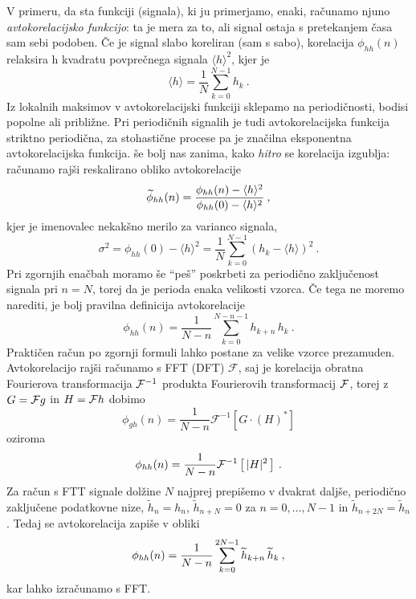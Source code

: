 \documentclass{article}
\begin{document}
V primeru, da sta funkciji (signala), ki ju primerjamo, enaki,
računamo njuno {\sl avtokorelacijsko funkcijo\/}: ta je mera
za to, ali signal ostaja s pretekanjem časa sam sebi podoben.
Če je signal slabo koreliran (sam s sabo), korelacija $\phi_{hh}(n)$
relaksira h kvadratu povprečnega signala $\langle h\rangle^2$, kjer je
\begin{equation*}
\langle h\rangle = \frac{1}{N} \sum_{k=0}^{N-1} h_k \>.  
\end{equation*}
Iz lokalnih maksimov v avtokorelacijski funkciji sklepamo
na periodičnosti, bodisi popolne ali približne.
Pri periodičnih signalih je tudi avtokorelacijska funkcija
striktno periodična, za stohastične procese pa je značilna
eksponentna avtokorelacijska funkcija.
še bolj nas zanima, kako {\sl hitro\/} se korelacija izgublja:
računamo rajši reskalirano obliko avtokorelacije
\begin{equation*}
\widetilde{\phi}_{hh}(n) = 
{ \phi_{hh}(n) - \langle h\rangle^2 \over \phi_{hh}(0) - \langle h\rangle^2 } \>,  
\end{equation*}
kjer je imenovalec nekakšno merilo za  varianco signala,
\begin{equation*}
\sigma^2 = \phi_{hh}(0) - \langle h\rangle^2 
= \frac{1}{N} \sum_{k=0}^{N-1} \left( h_k - \langle h\rangle \right)^2 \>.  
\end{equation*}
Pri zgornjih enačbah moramo še ``peš'' poskrbeti za periodično
zaključenost signala pri $n=N$, torej da je perioda enaka velikosti
vzorca.  Če tega ne moremo narediti, je bolj pravilna definicija
avtokorelacije
\begin{equation*}
\phi_{hh}(n)= \frac{1}{N-n}\sum_{k=0}^{N-n-1} h_{k+n}\, h_k \>.  
\end{equation*}
Praktičen račun po zgornji formuli lahko postane za velike
vzorce prezamuden.  Avtokorelacijo rajši računamo s FFT (DFT) $\mathcal{F}$,
saj je korelacija obratna Fourierova transformacija ${\cal F}^{-1}$
produkta Fourierovih transformacij ${\cal F}$, torej z $G={\cal F}g$ in $H={\cal F}h$ dobimo
\begin{equation*}
\phi_{gh}(n) = \frac{1}{N-n}\mathcal{F}^{-1} \left[ G \cdot (H)^\ast \right]
\end{equation*}
oziroma
\begin{equation*}
  \phi_{hh}(n) = \frac{1}{N-n}{\cal F}^{-1} \left[ \, | H |^2 \, \right] \>.
\end{equation*}
Za račun s FTT signale dolžine $N$ najprej prepišemo v dvakrat
daljše, periodično zaključene podatkovne nize, $\widetilde{h}_n = h_n$,
$\widetilde{h}_{n+N} = 0$ za $n = 0, \ldots, N-1$
in $\widetilde{h}_{n+2N} = \widetilde{h}_{n}$.
Tedaj se avtokorelacija zapiše v obliki
\begin{equation*}
\phi_{hh}(n)={1\over N-n}\sum_{k=0}^{2N-1}\widetilde{h}_{k+n}\,\widetilde{h}_k \>,  
\end{equation*}
kar lahko izračunamo s FFT.
\end{document}

